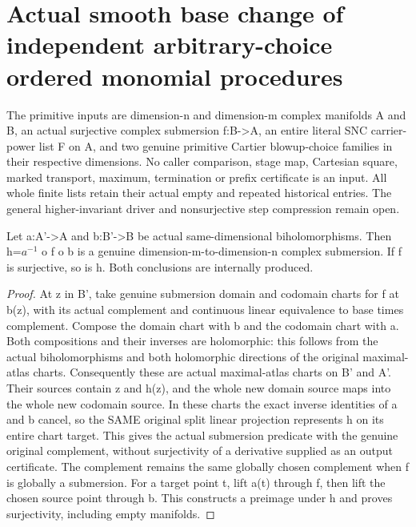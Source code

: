 \section{Actual smooth base change of independent arbitrary-choice ordered monomial procedures}

The primitive inputs are dimension-n and dimension-m complex manifolds A and
B, an actual surjective complex submersion f:B->A, an entire literal SNC
carrier-power list F on A, and two genuine primitive Cartier blowup-choice
families in their respective dimensions. No caller comparison, stage map,
Cartesian square, marked transport, maximum, termination or prefix
certificate is an input. All whole finite lists retain their actual empty
and repeated historical entries. The general higher-invariant driver and
nonsurjective step compression remain open.

\begin{lemma}
\label{hir:submersion-choice-actual-conjugate-charts}
\leanok
Let a:A'->A and b:B'->B be actual same-dimensional biholomorphisms. Then
h=$a^{-1}$ o f o b is a genuine dimension-m-to-dimension-n complex submersion.
If f is surjective, so is h. Both conclusions are internally produced.
\end{lemma}
\begin{proof}
At z in B', take genuine submersion domain and codomain charts for f at b(z),
with its actual complement and continuous linear equivalence to base times
complement. Compose the domain chart with b and the codomain chart with a.
Both compositions and their inverses are holomorphic: this follows from the
actual biholomorphisms and both holomorphic directions of the original
maximal-atlas charts. Consequently these are actual maximal-atlas charts
on B' and A'. Their sources contain z and h(z), and the whole new domain
source maps into the whole new codomain source. In these charts the exact
inverse identities of a and b cancel, so the SAME original split linear
projection represents h on its entire chart target. This gives the actual
submersion predicate with the genuine original complement, without
surjectivity of a derivative supplied as an output certificate. The
complement remains the same globally chosen complement when f is globally
a submersion. For a target point t, lift a(t) through f, then lift the chosen
source point through b. This constructs a preimage under h and proves
surjectivity, including empty manifolds.
\end{proof}

